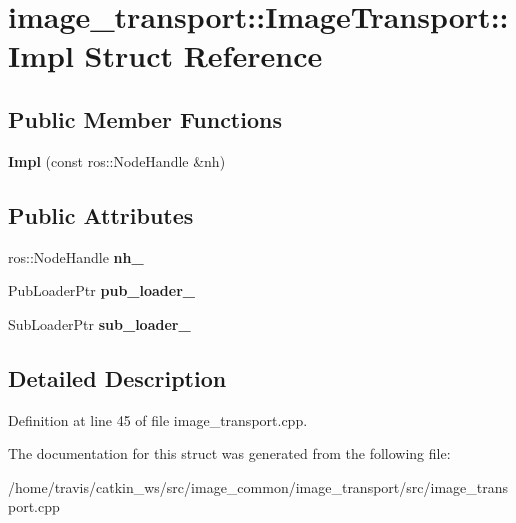\hypertarget{structimage__transport_1_1_image_transport_1_1_impl}{\section{image\-\_\-transport\-:\-:Image\-Transport\-:\-:Impl Struct Reference}
\label{structimage__transport_1_1_image_transport_1_1_impl}
}
\subsection*{Public Member Functions}
\begin{DoxyCompactItemize}
\item 
\hypertarget{structimage__transport_1_1_image_transport_1_1_impl_a107ebb9cf987b5d10035b593f23a426f}{{\bfseries Impl} (const ros\-::\-Node\-Handle \&nh)}\label{structimage__transport_1_1_image_transport_1_1_impl_a107ebb9cf987b5d10035b593f23a426f}

\end{DoxyCompactItemize}
\subsection*{Public Attributes}
\begin{DoxyCompactItemize}
\item 
\hypertarget{structimage__transport_1_1_image_transport_1_1_impl_a9beb4309b046faa701ed1c02558043ff}{ros\-::\-Node\-Handle {\bfseries nh\-\_\-}}\label{structimage__transport_1_1_image_transport_1_1_impl_a9beb4309b046faa701ed1c02558043ff}

\item 
\hypertarget{structimage__transport_1_1_image_transport_1_1_impl_a89df837150dc5781cd19591860c4f7cd}{Pub\-Loader\-Ptr {\bfseries pub\-\_\-loader\-\_\-}}\label{structimage__transport_1_1_image_transport_1_1_impl_a89df837150dc5781cd19591860c4f7cd}

\item 
\hypertarget{structimage__transport_1_1_image_transport_1_1_impl_a16184c366e22f87a073490ef88c83d18}{Sub\-Loader\-Ptr {\bfseries sub\-\_\-loader\-\_\-}}\label{structimage__transport_1_1_image_transport_1_1_impl_a16184c366e22f87a073490ef88c83d18}

\end{DoxyCompactItemize}


\subsection{Detailed Description}


Definition at line 45 of file image\-\_\-transport.\-cpp.



The documentation for this struct was generated from the following file\-:\begin{DoxyCompactItemize}
\item 
/home/travis/catkin\-\_\-ws/src/image\-\_\-common/image\-\_\-transport/src/image\-\_\-transport.\-cpp\end{DoxyCompactItemize}

